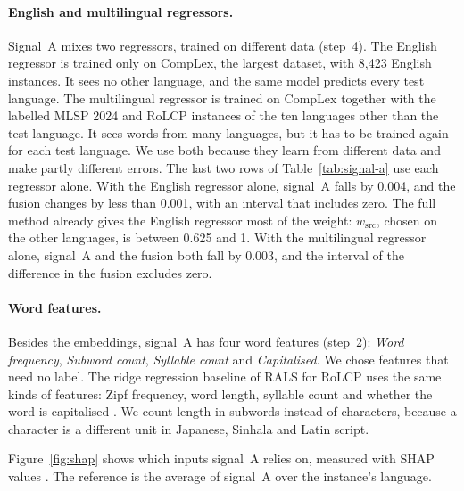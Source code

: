 \paragraph{English and multilingual regressors.} Signal~A mixes two regressors, trained on different %
data (step~4). The English regressor is trained only on CompLex, the largest dataset, with 8{,}423 %
English instances. It sees no other language, and the same model predicts every test language. The %
multilingual regressor is trained on CompLex together with the labelled MLSP 2024 and RoLCP
instances of the ten languages other than the test language. It sees words from many languages, %
but it has to be trained again for each test language. We use both because they learn from
different data and make partly different errors. The last two rows of Table~\ref{tab:signal-a} use
each regressor alone. With the
English regressor alone, signal~A falls by 0.004, and the fusion changes by less than 0.001, with %
an interval that includes zero. The full method already gives the English regressor most of the
weight: $w_{\mathrm{src}}$, chosen on the other languages, is between 0.625 and 1. With the %
multilingual regressor alone, signal~A and the fusion both fall by 0.003, and the interval of the %
difference in the fusion excludes zero.

\paragraph{Word features.} Besides the embeddings, signal~A has four word features (step~2): %
\emph{Word frequency}, \emph{Subword count}, \emph{Syllable count} and \emph{Capitalised}. We chose
features that need no label. The ridge regression baseline of RALS for RoLCP uses the same kinds of %
features: Zipf frequency, word length, syllable count and whether the word is capitalised
\citep{anghel-etal-2025-rals}. We count length in subwords instead of characters, because a
character is a different unit in Japanese, Sinhala and Latin script.
\label{sec:shap}

Figure~\ref{fig:shap} shows which inputs signal~A relies on, measured with SHAP values
\citep{lundberg-lee-2017-unified}. The reference is the average of signal~A over the instance's %
language.

